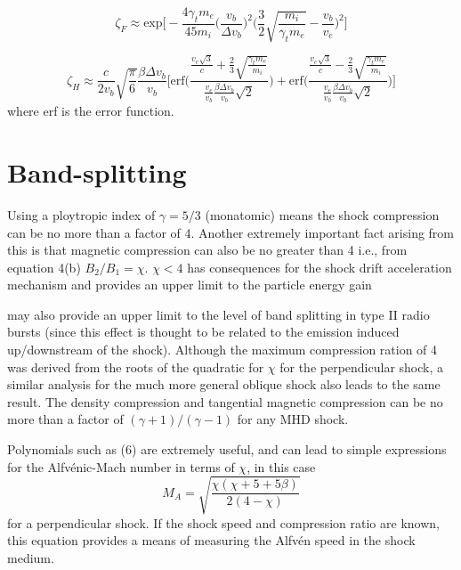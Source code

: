 \begin{equation}
\zeta_F  \approx \mathrm{exp} \bigg[  -\frac{4\gamma_t m_e}{45 m_i}    \bigg(\frac{v_b}{\Delta v_b}\bigg)^2   \bigg(  \frac{3}{2}  \sqrt{\frac{m_i}{\gamma_t m_e}} - \frac{v_b}{v_e}  \bigg)^2    \bigg]
\end{equation}

\begin{equation}
\zeta_H \approx \frac{c}{2v_b} \sqrt{\frac{\pi}{6}} \frac{\beta \Delta v_b}{v_b}
\Bigg[  \mathrm{erf}\Bigg(     \frac{ \frac{v_e\sqrt{3}}{c}  + \frac{2}{3} \sqrt{\frac{\gamma_t m_e}{m_i}}  }  {\frac{v_e}{v_b} \frac{\beta \Delta v_b}{v_b} \sqrt{2} }   \Bigg)     +   \mathrm{erf}\Bigg(     \frac{ \frac{v_e\sqrt{3}}{c}  - \frac{2}{3} \sqrt{\frac{\gamma_t m_e}{m_i}}  }  {\frac{v_e}{v_b} \frac{\beta \Delta v_b}{v_b} \sqrt{2} }   \Bigg)   \Bigg]
\end{equation}
where erf is the error function. 


\section{Band-splitting}
Using a ploytropic index of $\gamma=5/3$ (monatomic) means the shock compression can be no more than a factor of 4. Another extremely important fact arising from this is that magnetic compression can also be no greater than 4 i.e., from equation 4(b) $B_{2}/B_{1}=\chi$. $\chi<4$ has consequences for the shock drift acceleration mechanism and provides an upper limit to the particle energy gain

may also provide an upper limit to the level of band splitting in type II radio bursts (since this effect is thought to be related to the emission induced up/downstream of the shock). Although the maximum compression ration of 4 was derived from the roots of the quadratic for $\chi$ for the perpendicular shock, a similar analysis for the much more general oblique shock also leads to the same result. The density compression and tangential magnetic compression can be no more than a factor of $(\gamma+1)/(\gamma-1)$ for any MHD shock. 

Polynomials such as (6) are extremely useful, and can lead to simple expressions for the Alfv\'{e}nic-Mach number in terms of $\chi$, in this case
\begin{equation}
M_{A}=\sqrt{\frac{\chi(\chi+5+5\beta)}{2(4-\chi)}} 
\end{equation}
for a perpendicular shock. If the shock speed and compression ratio are known, this equation provides a means of measuring the Alfv\'{e}n speed in the shock medium. 

